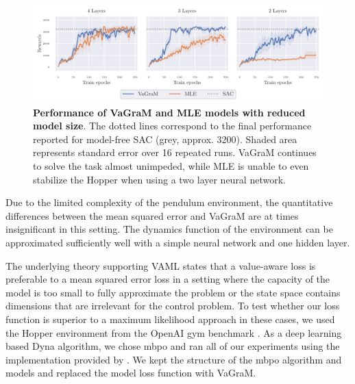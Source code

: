 \begin{figure}[t]
\begin{center}
    \includegraphics[clip, trim=0.2cm 0.0cm 0.4cm 0.0cm, width=1.\linewidth]{figures/vagram/fig_2.pdf}
\end{center}
    \caption{\textbf{Performance of VaGraM and MLE models with reduced model size}. The dotted lines correspond to the final performance reported for model-free SAC (grey, approx. 3200). Shaded area represents standard error over 16 repeated runs. VaGraM continues to solve the task almost unimpeded, while MLE is unable to even stabilize the Hopper when using a two layer neural network.}
    \label{fig:vagram:pendulum_small}
\end{figure}
Due to the limited complexity of the pendulum environment, the quantitative differences between the mean squared error and VaGraM are at times insignificant in this setting.
The dynamics function of the environment can be approximated sufficiently well with a simple neural network and one hidden layer.

The underlying theory supporting VAML states that a value-aware loss is preferable to a mean squared error loss in a setting where the capacity of the model is too small to fully approximate the problem or the state space contains dimensions that are irrelevant for the control problem.
To test whether our loss function is superior to a maximum likelihood approach in these cases, we used the Hopper environment from the OpenAI gym benchmark \parencite{brockman2016openai}. 
As a deep learning based Dyna algorithm, we chose \ac{mbpo} \parencite{mbpo} and ran all of our experiments using the implementation provided by \cite{pineda2021mbrl}.
We kept the structure of the \ac{mbpo} algorithm and models and replaced the model loss function with VaGraM.

